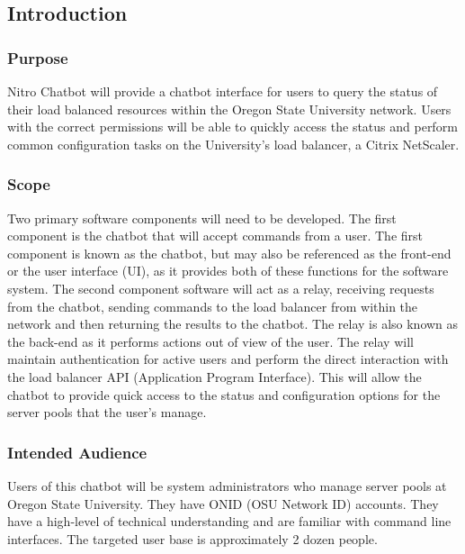 \subsection{Introduction}

\subsubsection{Purpose}
Nitro Chatbot will provide a chatbot interface for users to query the status of their load balanced resources within the Oregon State University network.
Users with the correct permissions will be able to quickly access the status and perform common configuration tasks on the University's load balancer, a Citrix NetScaler.

\subsubsection{Scope}
Two primary software components will need to be developed.
The first component is the chatbot that will accept commands from a user.
The first component is known as the chatbot, but may also be referenced as the front-end or the user interface (UI), as it provides both of these functions for the software system.
The second component software will act as a relay, receiving requests from the chatbot, sending commands to the load balancer from within the network and then returning the results to the chatbot.
The relay is also known as the back-end as it performs actions out of view of the user.
The relay will maintain authentication for active users and perform the direct interaction with the load balancer API (Application Program Interface).
This will allow the chatbot to provide quick access to the status and configuration options for the server pools that the user's manage.

\subsubsection{Intended Audience}
Users of this chatbot will be system administrators who manage server pools at Oregon State University. They have ONID (OSU Network ID) accounts.
They have a high-level of technical understanding and are familiar with command line interfaces.
The targeted user base is approximately 2 dozen people.

